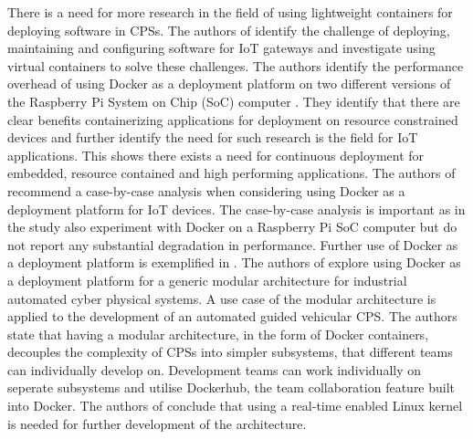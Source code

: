 There is a need for more research in the field of using lightweight containers for deploying software in CPSs. The authors of \cite{2iot} identify the challenge of deploying, maintaining and configuring software for IoT gateways and investigate using virtual containers to solve these challenges. The authors identify the performance overhead of using Docker as a deployment platform on two different versions of the Raspberry Pi System on Chip (SoC) computer \cite{raspberry}. They identify that there are clear benefits containerizing applications for deployment on resource constrained devices and further identify the need for such research is the field for IoT applications. This shows there exists a need for continuous deployment for embedded, resource contained and high performing applications. The authors of \cite{2iot} recommend a case-by-case analysis when considering using Docker as a deployment platform for IoT devices. The case-by-case analysis is important as in \cite{gonz} the study also experiment with Docker on a Raspberry Pi SoC computer but do not report any substantial degradation in performance. Further use of Docker as a deployment platform is exemplified in \cite{gonz}. The authors of \cite{gonz} explore using Docker as a deployment platform for a generic modular architecture for industrial automated cyber physical systems. A use case of the modular architecture is applied to the development of an automated guided vehicular CPS. The authors state that having a modular architecture, in the form of Docker containers, decouples the complexity of CPSs into simpler subsystems, that different teams can individually develop on. Development teams can work individually on seperate subsystems and utilise Dockerhub, the team collaboration feature built into Docker. The authors of \cite{gonz} conclude that using a real-time enabled Linux kernel is needed for further development of the architecture. \\

